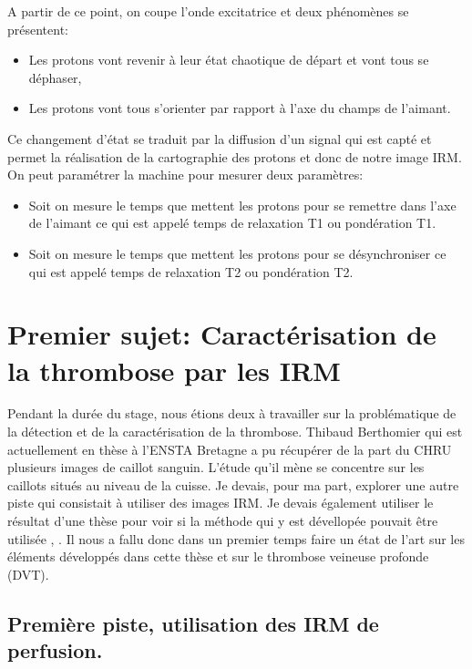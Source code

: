 A partir de ce point, on coupe l'onde excitatrice et deux phénomènes se présentent:

\begin{itemize}
\item Les protons vont revenir à leur état chaotique de départ et vont tous se déphaser,
\item Les protons vont tous s'orienter par rapport à l'axe du champs de l'aimant.
\end{itemize}

Ce changement d'état se traduit par la diffusion d'un signal qui est capté et permet la réalisation de la cartographie des protons et donc de notre image IRM. On peut paramétrer la machine pour mesurer deux paramètres:

\begin{itemize}
\item Soit on mesure le temps que mettent les protons pour se remettre dans l'axe de l'aimant ce qui est appelé temps de relaxation T1 ou pondération T1.
\item Soit on mesure le temps que mettent les protons pour se désynchroniser ce qui est appelé temps de relaxation T2 ou pondération T2.
\end{itemize}


\chapter{Premier sujet: Caractérisation de la thrombose par les IRM}


Pendant la durée du stage, nous étions deux à travailler sur la problématique de la détection et de la caractérisation de la thrombose. Thibaud Berthomier qui est actuellement en thèse à l'ENSTA Bretagne a pu récupérer de la part du CHRU plusieurs images de caillot sanguin. L'étude qu'il mène se concentre sur les caillots situés au niveau de la cuisse. Je devais, pour ma part, explorer une autre piste qui consistait à utiliser des images IRM. Je devais également utiliser le résultat d'une thèse pour voir si la méthode qui y est dévellopée pouvait être utilisée \cite{tartare2014contribution}, \cite{tartare2014spectral}. Il nous a fallu donc dans un premier temps faire un état de l'art sur les éléments développés dans cette thèse et sur le thrombose veineuse profonde (DVT).


\section{Première piste, utilisation des IRM de perfusion.}

